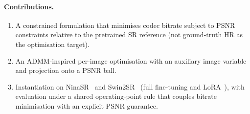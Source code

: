 \paragraph{Contributions.}
\begin{enumerate}
    \item A constrained formulation that minimises codec bitrate subject to PSNR
    constraints relative to the pretrained SR reference (not ground-truth HR as
    the optimisation target).
    \item An ADMM-inspired per-image optimisation with an auxiliary image
    variable and projection onto a PSNR ball.
    \item Instantiation on NinaSR~\cite{gouvine2021torchsr} and
    Swin2SR~\cite{conde2022swin2sr} (full fine-tuning and
    LoRA~\cite{hu2021lora}), with evaluation under a shared operating-point rule
    that couples bitrate minimisation with an explicit PSNR guarantee.
\end{enumerate}
